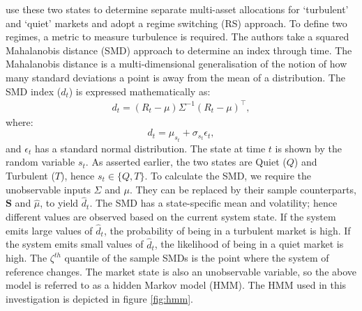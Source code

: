 \documentclass[
]{article}
\begin{document}
\citet{K12} use these two states to determine separate multi-asset allocations for `turbulent' and `quiet'
markets and adopt a regime switching (RS) approach. To define two regimes, a metric to measure
turbulence is required. The authors take a squared Mahalanobis distance (SMD) approach to determine an
index through time. The Mahalanobis distance is a multi-dimensional generalisation of the notion of how
many standard deviations a point is away from the mean of a distribution. The SMD index (\(d_t\)) is
expressed mathematically as:
\begin{align}
d_t = (R_t - \mu)\Sigma^{-1}(R_t - \mu)^\intercal,
\end{align}
where: \[d_t = \mu_{s_t} + \sigma_{s_t}\epsilon_t,\] and \(\epsilon_t\) has a standard normal
distribution. The state at time \(t\) is shown by the random variable \(s_t\). As asserted earlier, the two
states are Quiet (\(Q\)) and Turbulent (\(T\)), hence \(s_t \in \{Q, T\}\). To calculate the SMD, we require
the unobservable inputs \(\Sigma\) and \(\mu\). They can be replaced by their sample counterparts,
\(\textbf{S}\) and \(\hat{\mu}\), to yield \(\hat{d}_t\). The SMD has a state-specific mean and volatility;
hence different values are observed based on the current system state. If the system emits large values
of \(\hat{d}_t\), the probability of being in a turbulent market is high. If the system emits small
values of \(\hat{d}_t\), the likelihood of being in a quiet market is high. The \(\zeta^{th}\) quantile of
the sample SMDs is the point where the system of reference changes. The market state is also an
unobservable variable, so the above model is referred to as a hidden Markov model (HMM). The HMM used
in this investigation is depicted in figure \ref{fig:hmm}.
\end{document}
